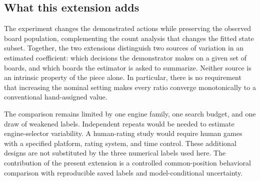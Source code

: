 \subsection{What this extension adds}
The experiment changes the demonstrated actions while preserving the observed board population, complementing the count analysis that changes the fitted state subset. Together, the two extensions distinguish two sources of variation in an estimated coefficient: which decisions the demonstrator makes on a given set of boards, and which boards the estimator is asked to summarize. Neither source is an intrinsic property of the piece alone. In particular, there is no requirement that increasing the nominal setting makes every ratio converge monotonically to a conventional hand-assigned value.

The comparison remains limited by one engine family, one search budget, and one draw of weakened labels. Independent repeats would be needed to estimate engine-selector variability. A human-rating study would require human games with a specified platform, rating system, and time control. These additional designs are not substituted by the three numerical labels used here. The contribution of the present extension is a controlled common-position behavioral comparison with reproducible saved labels and model-conditional uncertainty.
